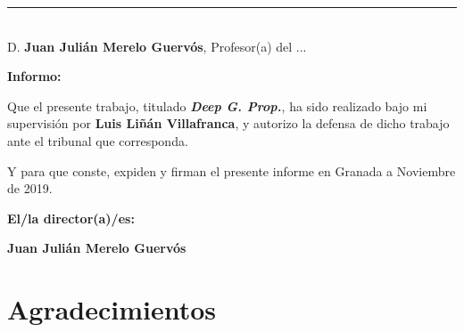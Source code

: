 \noindent\rule[-1ex]{\textwidth}{2pt}\\[4.5ex]

D. \textbf{Juan Julián Merelo Guervós}, Profesor(a) del ...

\vspace{0.5cm}

\textbf{Informo:}

\vspace{0.5cm}

Que el presente trabajo, titulado \textit{\textbf{Deep G. Prop.}}, ha sido realizado
bajo mi supervisión por \textbf{Luis Liñán Villafranca}, y autorizo la defensa de dicho
trabajo ante el tribunal que corresponda.

\vspace{0.5cm}

Y para que conste, expiden y firman el presente informe en Granada a Noviembre de
2019.

\vspace{1cm}

\textbf{El/la director(a)/es:}

\vspace{5cm}

\noindent\textbf{Juan Julián Merelo Guervós}

\chapter*{Agradecimientos}




